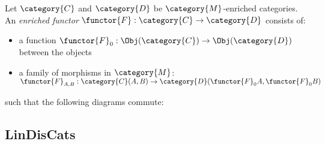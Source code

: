 \documentclass[DIN, pagenumber=false, fontsize=11pt, parskip=half, colorinlistoftodos, svgnames]{scrartcl}
\begin{document}
	\begin{definition}
		\label{def: enrichedFunctors}
		Let $\category{C} $ and $\category{D} $ be $\category{M} $-enriched categories. An \emph{enriched functor} $\functor{F} : \category{C} \rightarrow \category{D} $ consists of:
		\begin{itemize}
			\item 
			a function $\functor{F}_0 : \Obj(\category{C}) \rightarrow \Obj(\category{D}) $ between the objects
			\item 
			a family of morphisms in $\category{M} $: $\functor{F}_{A,B} : \category{C}(A, B) \rightarrow \category{D}(\functor{F}_0 A , \functor{F}_0 B) $
		\end{itemize}
		such that the following diagrams commute:
		\begin{center}
		\end{center}
	\end{definition}
	
	
	\subsection{LinDisCats}
	\label{sec: linDisCats}
	
\end{document}
